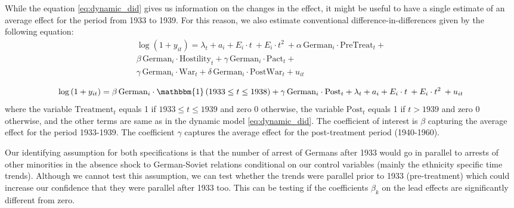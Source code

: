 While the equation \ref{eq:dynamic_did} gives us information on the changes in the effect, it might be useful to have a single estimate of an average effect for the period from 1933 to 1939. For this reason, we also estimate conventional difference-in-differences given by the following equation:
\begin{equation}
\begin{aligned}
 \log\left(1 + y_{it}\right) = 
 \lambda_t + a_i +  E_i \cdot t \:  + E_i \cdot t^2 \: +
  \alpha \, \text{German}_{i} \cdot \text{PreTreat}_{t}  +  \\ %
 \beta \, \text{German}_{i} \cdot \text{Hostility}_{t} +
 \gamma \, \text{German}_{i} \cdot \text{Pact}_{t} + \\
 \gamma \, \text{German}_{i} \cdot \text{War}_{t} +
 \delta \, \text{German}_{i} \cdot \text{PostWar}_{t}  + u_{it}
 \label{eq:simple_did}
 \end{aligned}
\end{equation}

\begin{equation}
\begin{split}
 \log\left(1 + y_{it}\right) =  \beta \, \text{German}_{i} \cdot  \mathbbm{1}\left(1933 \leq t \leq 1938 \right) +
 \gamma \, \text{German}_{i} \cdot \text{Post}_{t} +
 \lambda_t + a_i +  E_i \cdot t \:  + E_i \cdot t^2 \:    + u_{it}
 \label{eq:simple_did}
 \end{split}
\end{equation}
where the variable $\text{Treatment}_{t}$ equals 1 if $ 1933  \leq t \leq 1939 $ and zero 0 otherwise, the variable $\text{Post}_{t}$ equals 1 if $t > 1939 $ and zero 0 otherwise, and the other terms are same as in the dynamic model \ref{eq:dynamic_did}.
The coefficient of interest is $\beta$ capturing the average effect for the period 1933-1939. The coefficient $\gamma$ captures the average effect for the post-treatment period (1940-1960).


Our identifying assumption for both specifications is that the number of arrest of Germans after 1933 would go in parallel to arrests of other minorities in the absence shock to German-Soviet relations conditional on our control variables (mainly the ethnicity specific time trends). Although we cannot test this assumption, we can test whether the trends were parallel prior to 1933 (pre-treatment) which could increase our confidence that they were parallel after 1933 too. This can be testing if the coefficients $\beta_k$ on the lead effects are significantly different from zero.  


